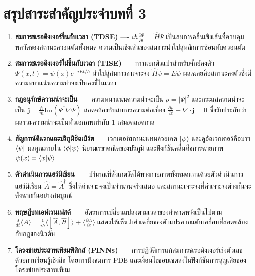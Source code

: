 \section{สรุปสาระสำคัญประจำบทที่ 3}

\begin{enumerate}
    \item \textbf{สมการชเรอดิงเงอร์ขึ้นกับเวลา (TDSE)} ---- $i\hbar \frac{\partial \Psi}{\partial t} = \hat{H}\Psi$ เป็นสมการคลื่นเชิงเส้นที่ควบคุมพลวัตของสถานะควอนตัมทั้งหมด ความเป็นเชิงเส้นของสมการนำไปสู่หลักการซ้อนทับควอนตัม
    \item \textbf{สมการชเรอดิงเงอร์ไม่ขึ้นกับเวลา (TISE)} ---- การแยกตัวแปรสำหรับศักย์คงตัว $\Psi(x, t) = \psi(x)e^{-iEt/\hbar}$ นำไปสู่สมการค่าเจาะจง $\hat{H}\psi = E\psi$ ผลเฉลยคือสถานะคงตัวซึ่งมีความหนาแน่นความน่าจะเป็นคงที่ในเวลา
    \item \textbf{กฎอนุรักษ์ความน่าจะเป็น} ---- ความหนาแน่นความน่าจะเป็น $\rho = |\Psi|^2$ และกระแสความน่าจะเป็น $\mathbf{j} = \frac{\hbar}{m}\text{Im}(\Psi^*\nabla\Psi)$ สอดคล้องกับสมการความต่อเนื่อง $\frac{\partial\rho}{\partial t} + \nabla\cdot\mathbf{j} = 0$ ซึ่งรับประกันว่าผลรวมความน่าจะเป็นทั่วเอกภพเท่ากับ 1 เสมอตลอดกาล
    \item \textbf{สัญกรณ์ดิแรกและปริภูมิฮิลเบิร์ต} ---- เวกเตอร์สถานะแทนด้วยเคต $\ket{\psi}$ และดูอัลเวกเตอร์คือบรา $\bra{\psi}$ ผลคูณภายใน $\braket{\phi}{\psi}$ นิยามเรขาคณิตของปริภูมิ และฟังก์ชันคลื่นคือการฉายภาพ $\psi(x) = \braket{x}{\psi}$
    \item \textbf{ตัวดำเนินการแฮร์มิเชียน} ---- ปริมาณที่สังเกตวัดได้ทางกายภาพทั้งหมดแทนด้วยตัวดำเนินการแฮร์มิเชียน $\hat{A} = \hat{A}^\dagger$ ซึ่งให้ค่าเจาะจงเป็นจำนวนจริงเสมอ และสถานะเจาะจงที่ค่าเจาะจงต่างกันจะตั้งฉากกันอย่างสมบูรณ์
    \item \textbf{ทฤษฎีบทเอห์เรนเฟสต์} ---- อัตราการเปลี่ยนแปลงตามเวลาของค่าคาดหวังเป็นไปตาม $\frac{d}{dt}\langle A \rangle = \frac{1}{i\hbar}\langle [\hat{A}, \hat{H}] \rangle + \langle \frac{\partial \hat{A}}{\partial t} \rangle$ แสดงให้เห็นว่าค่าเฉลี่ยของตัวแปรควอนตัมเคลื่อนที่สอดคล้องกับกฎของนิวตัน
    \item \textbf{โครงข่ายประสาทเทียมฟิสิกส์ (PINNs)} ---- การปฏิวัติการแก้สมการชเรอดิงเงอร์เชิงตัวเลขด้วยการเรียนรู้เชิงลึก โดยการฝังสมการ PDE และเงื่อนไขขอบเขตลงในฟังก์ชันการสูญเสียของโครงข่ายประสาทเทียม
\end{enumerate}

